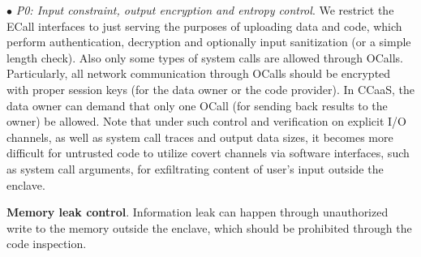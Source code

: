 \vspace{2pt}\noindent$\bullet$\textit{ P0: Input constraint, output encryption and entropy control}.
We restrict the ECall interfaces to just serving the purposes of uploading data and code, which perform authentication, decryption and optionally input sanitization (or a simple length check). Also only some types of system calls are allowed through OCalls. Particularly, all network communication through OCalls should be encrypted with proper session keys (for the data owner or the code provider). In CCaaS, the data owner can demand that only one OCall (for sending back results to the owner) be allowed. Note that under such control and verification on explicit I/O channels, as well as system call traces and output data sizes, it becomes more difficult for untrusted code to utilize covert channels via software interfaces, such as system call arguments, for exfiltrating content of user’s input outside the enclave.


\vspace{3pt}\noindent\textbf{Memory leak control}. Information leak can happen through unauthorized write to the memory outside the enclave, which should be prohibited through the code inspection. 


